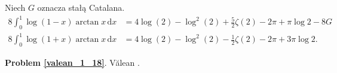 %

\begin{problem_with_solution}
    \label{valean_1_18}%
    Niech $G$ oznacza stałą Catalana.
    \begin{align}
        8 \int_0^1 \log (1 - x) \arctan x \,\mathrm{d}x & = 4 \log (2) - \log^2 (2) + \frac 5 2 \zeta(2) - 2 \pi + \pi \log 2 - 8 G \\
        8 \int_0^1 \log (1 + x) \arctan x \,\mathrm{d}x & = 4 \log (2) - \log^2 (2) - \frac 1 2 \zeta(2) - 2 \pi + 3 \pi \log 2.
    \end{align} 
\end{problem_with_solution}



\textbf{Problem \ref{valean_1_18}}.
Vălean \cite[s. 10, 11]{nahin15}.


%